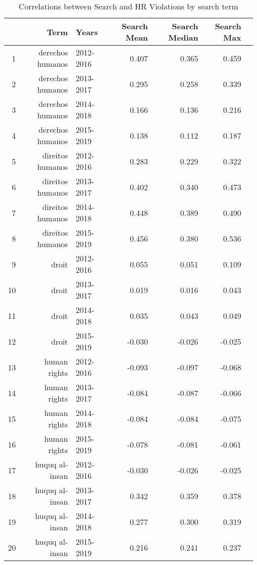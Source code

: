 \begin{table}[ht]
\centering
\begin{tabular}{|r|rlrrrr||}
  \hline
 & Term & Years & Search Mean & Search Median & Search Max \\ 
  \hline
1 & derechos humanos & 2012-2016 & 0.407 & 0.365 & 0.459 \\ 
  2 & derechos humanos & 2013-2017 & 0.295 & 0.258 & 0.339 \\ 
  3 & derechos humanos & 2014-2018 & 0.166 & 0.136 & 0.216 \\ 
  4 & derechos humanos & 2015-2019 & 0.138 & 0.112 & 0.187 \\ 
  5 & direitos humanos & 2012-2016 & 0.283 & 0.229 & 0.322 \\ 
  6 & direitos humanos & 2013-2017 & 0.402 & 0.340 & 0.473 \\ 
  7 & direitos humanos & 2014-2018 & 0.448 & 0.389 & 0.490 \\ 
  8 & direitos humanos & 2015-2019 & 0.456 & 0.380 & 0.536 \\ 
  9 & droit & 2012-2016 & 0.055 & 0.051 & 0.109 \\ 
  10 & droit & 2013-2017 & 0.019 & 0.016 & 0.043 \\ 
  11 & droit & 2014-2018 & 0.035 & 0.043 & 0.049 \\ 
  12 & droit & 2015-2019 & -0.030 & -0.026 & -0.025 \\ 
  13 & human rights & 2012-2016 & -0.093 & -0.097 & -0.068 \\ 
  14 & human rights & 2013-2017 & -0.084 & -0.087 & -0.066 \\ 
  15 & human rights & 2014-2018 & -0.084 & -0.084 & -0.075 \\ 
  16 & human rights & 2015-2019 & -0.078 & -0.081 & -0.061 \\ 
  17 & huquq al-insan & 2012-2016 & -0.030 & -0.026 & -0.025 \\ 
  18 & huquq al-insan & 2013-2017 & 0.342 & 0.359 & 0.378 \\ 
  19 & huquq al-insan & 2014-2018 & 0.277 & 0.300 & 0.319 \\ 
  20 & huquq al-insan & 2015-2019 & 0.216 & 0.241 & 0.237 \\ 
   \hline
\end{tabular}
\caption{Correlations between Search and HR Violations by search term} 
\end{table}
